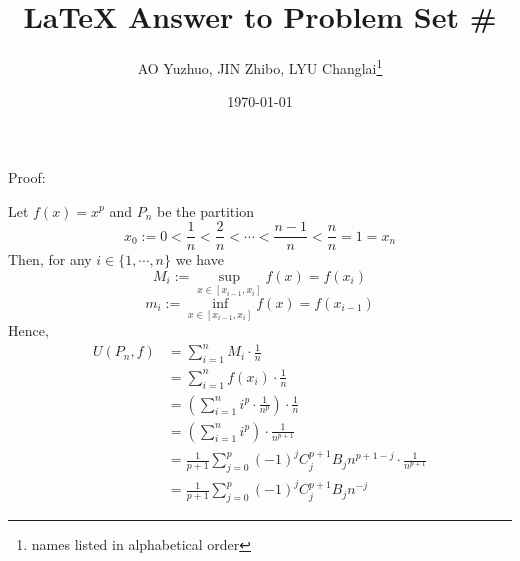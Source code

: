 \documentclass{article}
\title{\LaTeX{} Answer to Problem Set \#}
\author{AO Yuzhuo, JIN Zhibo, LYU Changlai\thanks{names listed in alphabetical order}}
\date{\today}
\begin{document}
\maketitle

\section{} %
Proof:

Let $f(x)=x^p$ and $P_n$ be the partition
$$x_0:=0<\frac{1}{n}<\frac{2}{n}<\cdots<\frac{n-1}{n}<\frac{n}{n}=1=x_n$$
Then, for any $i\in \{1,\cdots,n\}$ we have
$$M_i:= \sup_{x\in [x_{i-1},x_i]} f(x)=f(x_i)$$
$$m_i:= \inf_{x\in [x_{i-1},x_i]} f(x)=f(x_{i-1})$$
Hence,
\begin{align*}
U(P_n,f)&=\sum_{i=1}^{n}M_i\cdot \frac{1}{n}\\
&=\sum_{i=1}^{n}f(x_i)\cdot\frac{1}{n}\\
&=\left(\sum_{i=1}^{n}i^p\cdot\frac{1}{n^p}\right)\cdot\frac{1}{n}\\
&=\left(\sum_{i=1}^{n}i^p\right)\cdot\frac{1}{n^{p+1}}\\
&=\frac{1}{p+1}\sum_{j=0}^{p}(-1)^j C^{p+1}_j B_jn^{p+1-j}\cdot\frac{1}{n^{p+1}}\\
&=\frac{1}{p+1}\sum_{j=0}^{p}(-1)^j C^{p+1}_j B_jn^{-j}
\end{align*}
\end{document}
